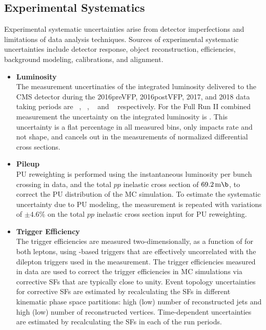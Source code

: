 \subsection{Experimental Systematics}
\label{Experimental_Systematics}
Experimental systematic uncertainties arise from detector imperfections and limitations of data analysis techniques.
Sources of experimental systematic uncertainties include detector response, object reconstruction, efficiencies, background modeling, calibrations, and alignment.
\begin{itemize}
    \item {\bf Luminosity} \\
    The measurement uncertinaties of the integrated luminosity delivered to the CMS detector during the 2016preVFP, 2016postVFP, 2017, and 2018 data taking periods are \lumierrSixPreVFP~\cite{bib:lumipas16}, \lumierrSixPostVFP~\cite{bib:lumipas16}, \lumierrSeven~\cite{bib:lumipas17} and \lumierrEight~\cite{bib:lumipas18} respectively. 
    For the Full Run II combined measurement the uncertainty on the integrated luminosity is \lumierrRuniiUL.
    This uncertainty is a flat percentage in all measured bins, only impacts rate and not shape, and cancels out in the measurements of normalized differential cross sections.
    \item {\bf Pileup} \\
    PU reweighting is performed using the instantaneous luminosity per bunch crossing in data, and the total $pp$ inelastic cross section of $\SI{69.2}{\m \b}$, to correct the PU distribution of the MC simulation.
    To estimate the systematic uncertainty due to PU modeling, the measurement is repeated with variations of $\pm 4.6\%$ on the total $pp$ inelastic cross section input for PU reweighting.
    \item {\bf Trigger Efficiency} \\
    The trigger efficiencies are measured two-dimensionally, as a function of \pT for both leptons, using \ETmiss-based triggers that are effectively uncorrelated with the dilepton triggers used in the measurement. 
    The trigger efficiencies measured in data are used to correct the trigger efficiencies in MC simulations via corrective SFs that are typically close to unity. 
    Event topology uncertainties for corrective SFs are estimated by recalculating the SFs in different kinematic phase space partitions: high (low) number of reconstructed jets and high (low) number of reconstructed vertices.
    Time-dependent uncertainties are estimated by recalculating the SFs in each of the run periods.

\end{itemize}
